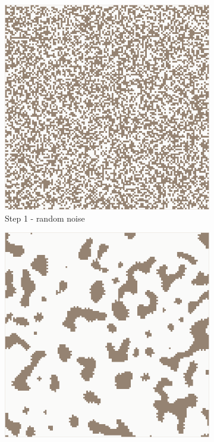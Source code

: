 \documentclass[12pt]{report}
\begin{document}
\begin{figure}[h]
	\centering
	\begin{subfigure}[b]{0.4\textwidth}
		\centering
		\includegraphics[width=\textwidth]{images/step1}
		\caption{Step 1 - random noise} 
	\end{subfigure}
	\hfill
	\begin{subfigure}[b]{0.4\textwidth}
		\centering
		\includegraphics[width=\textwidth]{images/step2}

\end{subfigure}
\end{figure}
\end{document}
